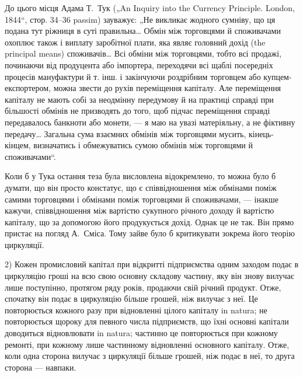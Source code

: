 До цього місця Адама Т.~Тук („An Inquiry into the Currency Principle.
London, 1844“, стор. 34--36 passim) зауважує: „Не викликає жодного
сумніву, що ця подана тут ріжниця в суті правильна\dots{} Обмін між торговцями
й споживачами охоплює також і виплату заробітної плати, яка
являє головний дохід (the principal means) споживачів\dots{} Всі обміни між
торговцями, тобто всі продажі, починаючи від продуцента або імпортера,
переходячи всі щаблі посередніх процесів мануфактури й т. інш. і закінчуючи
роздрібним торговцем або купцем-експортером, можна звести
до рухів переміщення капіталу. Але переміщення капіталу не мають собі
за неодмінну передумову й на практиці справді при більшості обмінів не
призводять до того, щоб підчас переміщення справді передавалось банкноти
або монети, — я маю на увазі матеріяльну, а не фіктивну передачу\dots{}
Загальна сума взаємних обмінів між торговцями мусить, кінець-кінцем,
визначатись і обмежуватись сумою обмінів між торговцями й споживачами“.

Коли б у Тука остання теза була висловлена відокремлено, то можна
було б думати, що він просто констатує, що є співвідношення між обмінами
поміж самими торговцями і обмінами поміж торговцями й споживачами, —
інакше кажучи, співвідношення між вартістю сукупного річного доходу й
вартістю капіталу, що за допомогою його продукується дохід. Однак це
не так. Він прямо пристає на погляд А.~Сміса. Тому зайве було б
критикувати зокрема його теорію циркуляції.

2) Кожен промисловий капітал при відкритті підприємства одним заходом
подає в циркуляцію гроші на всю свою основну складову частину, яку
він знову вилучає лише поступінно, протягом ряду років, продаючи свій
річний продукт. Отже, спочатку він подає в циркуляцію більше грошей,
ніж вилучає з неї. Це повторюється кожного разу при відновленні цілого
капіталу in natura; не повторюється щороку для певного числа підприємств,
що їхні основні капітали доводиться відновлювати in natura; частинно
це повторюється при кожному ремонті, при кожному лише частинному
відновленні основного капіталу. Отже, коли одна сторона
вилучає з циркуляції більше грошей, ніж подає в неї, то друга сторона —
навпаки.

